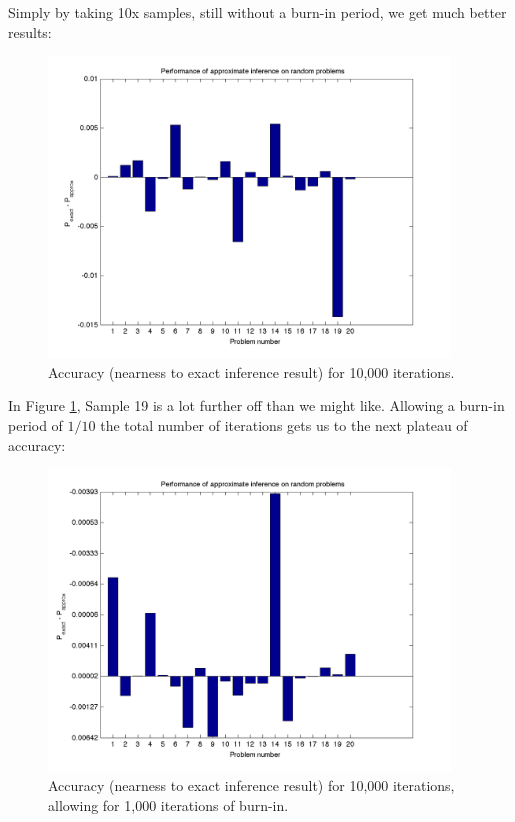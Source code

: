 \documentclass[11pt]{report}
\begin{document}
\noindent Simply by taking 10x samples, still without a burn-in period, we get much better results:

\begin{figure}[H]
  \centering
  \includegraphics[width=0.95\textwidth]{hw6-plot-n10000.png}
  \caption{Accuracy (nearness to exact inference result) for 10,000 iterations.}
  \label{fig:n10000}
\end{figure}

\noindent In Figure \ref{fig:n10000}, Sample 19 is a lot further off than we might like. Allowing a burn-in period of $1/10$ the total number of iterations gets us to the next plateau of accuracy:

\begin{figure}[H]
  \centering
  \includegraphics[width=0.95\textwidth]{hw6-plot-n10000-burnin.png}
  \caption{Accuracy (nearness to exact inference result) for 10,000 iterations, allowing for 1,000 iterations of burn-in.}
  \label{fig:n10000-burnin}
\end{figure}
\end{document}
